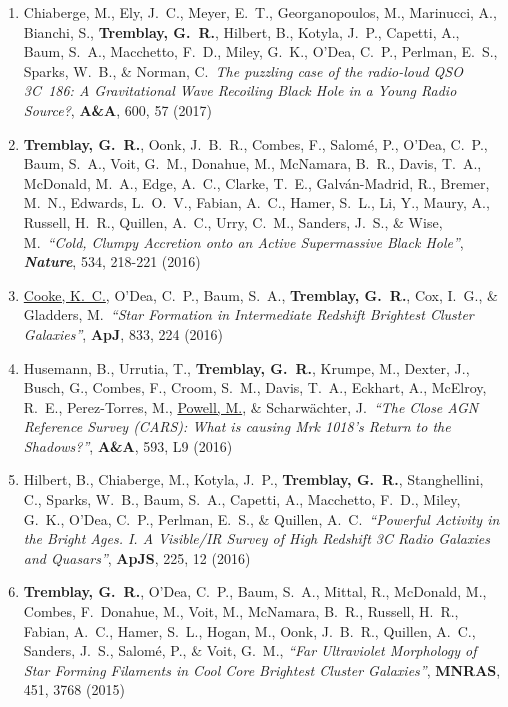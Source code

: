 \documentclass[11pt]{article}
\begin{document}
\begin{enumerate}
\item Chiaberge, M., Ely, J.~C., Meyer, E.~T., Georganopoulos, M., Marinucci, A., Bianchi, S.,  \textbf{Tremblay, G.~R.}, Hilbert, B.,
Kotyla, J.~P., Capetti, A., Baum, S.~A.,  Macchetto, F.~D., Miley, G.~K.,
O'Dea, C.~P., Perlman, E.~S., Sparks, W.~B., \& Norman, C.\ \textit{The puzzling case of the radio-loud QSO 3C~186: A Gravitational Wave Recoiling Black Hole in a Young Radio Source?}, \textbf{A\&A}, 600, 57 (2017)


\item \textbf{Tremblay, G.~R.}, Oonk, J.~B.~R., Combes, F., Salom\'{e}, P., O'Dea, C.~P., Baum, S.~A., Voit, G.~M., Donahue, M., McNamara, B.~R., Davis, T.~A., McDonald, M.~A., Edge, A.~C., Clarke, T.~E., Galv\'{a}n-Madrid, R., Bremer, M.~N., Edwards, L.~O.~V., Fabian, A.~C.,  Hamer, S.~L., Li, Y., Maury, A., Russell, H.~R., Quillen, A.~C., Urry, C.~M., Sanders, J.~S., \& Wise, M.\ \textit{``Cold, Clumpy Accretion onto an Active Supermassive Black Hole''}, \textit{\textbf{Nature}},  534, 218-221 (2016)


\item \uline{Cooke, K.~C.}, O'Dea, C.~P., Baum, S.~A., \textbf{Tremblay, G.~R.}, Cox, I.~G., \& Gladders, M.\ \textit{``Star Formation in Intermediate Redshift Brightest Cluster Galaxies''}, \textbf{ApJ}, 833, 224 (2016)


\item Husemann, B., Urrutia, T., \textbf{Tremblay, G.~R.}, Krumpe, M., Dexter, J., Busch, G., Combes, F., Croom, S.~M., Davis, T.~A., Eckhart, A., McElroy, R.~E., Perez-Torres, M., \uline{Powell, M.}, \& Scharw\"{a}chter, J.\ \textit{``The Close AGN Reference Survey (CARS): What is causing Mrk 1018's Return to the Shadows?''}, \textbf{A\&A}, 593, L9 (2016)



\item Hilbert, B., Chiaberge, M., Kotyla, J.~P., \textbf{Tremblay, G.~R.}, Stanghellini, C., Sparks, W.~B., Baum, S.~A., Capetti, A., Macchetto, F.~D., Miley, G.~K., O'Dea, C.~P., Perlman, E.~S., \& Quillen, A.~C.\ \textit{``Powerful Activity in the Bright Ages. I. A Visible/IR Survey of High Redshift 3C Radio Galaxies and Quasars''}, \textbf{ApJS}, 225, 12  (2016)


\item \textbf{Tremblay, G.~R.}, O'Dea, C.~P., Baum, S.~A., Mittal, R., McDonald, M., Combes, F.~Donahue, M., Voit, M., McNamara, B.~R., Russell, H.~R., Fabian, A.~C., Hamer, S.~L., Hogan, M., Oonk, J.~B.~R., Quillen, A.~C., Sanders, J.~S., Salom\'{e}, P., \& Voit, G.~M., \textit{``Far Ultraviolet Morphology of Star Forming Filaments in Cool Core Brightest Cluster Galaxies''}, \textbf{MNRAS}, 451, 3768 (2015)


\end{enumerate}
\end{document}
